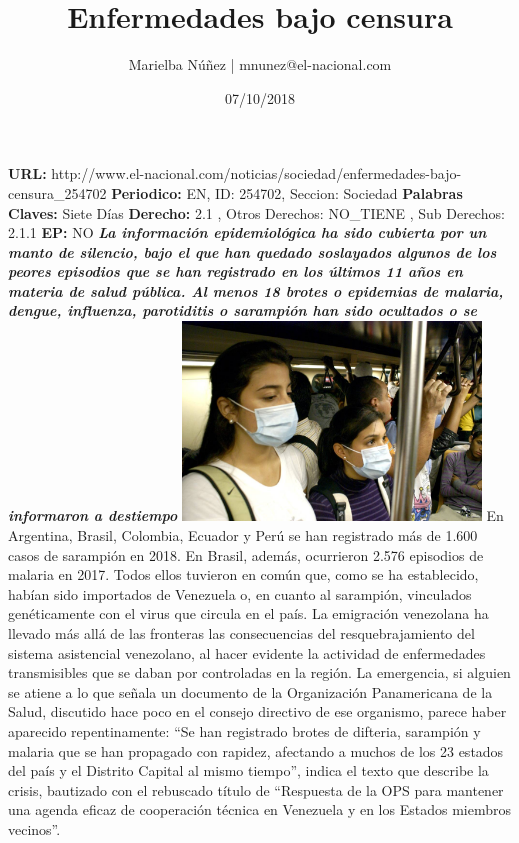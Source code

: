 \documentclass{article}%
\title{\textbf{Enfermedades bajo censura}}%
\author{Marielba Núñez | mnunez@el{-}nacional.com}%
\date{07/10/2018}%
\begin{document}
%
\normalsize%
\maketitle%
\textbf{URL: }%
http://www.el{-}nacional.com/noticias/sociedad/enfermedades{-}bajo{-}censura\_254702\newline%
%
\textbf{Periodico: }%
EN, %
ID: %
254702, %
Seccion: %
Sociedad\newline%
%
\textbf{Palabras Claves: }%
Siete Días\newline%
%
\textbf{Derecho: }%
2.1%
, Otros Derechos: %
NO\_TIENE%
, Sub Derechos: %
2.1.1%
\newline%
%
\textbf{EP: }%
NO\newline%
\newline%
%
\textbf{\textit{La información epidemiológica ha sido cubierta por un manto de silencio, bajo el que han quedado soslayados algunos de los peores episodios que se han registrado en los últimos 11 años en materia de salud pública. Al menos 18 brotes o epidemias de malaria, dengue, influenza, parotiditis o sarampión han sido ocultados o se informaron a destiempo}}%
\newline%
\newline%
%
\includegraphics[width=300px]{159.jpg}%
\newline%
%
En Argentina, Brasil, Colombia, Ecuador y Perú se han registrado más de 1.600 casos de sarampión en 2018. En Brasil, además, ocurrieron 2.576 episodios de malaria en 2017. Todos ellos tuvieron en común que, como se ha establecido, habían sido importados de Venezuela o, en cuanto al sarampión, vinculados genéticamente con el virus que circula en el país.%
\newline%
%
La emigración venezolana ha llevado más allá de las fronteras las consecuencias del resquebrajamiento del sistema asistencial venezolano, al hacer evidente la actividad de enfermedades transmisibles que se daban por controladas en la región. La emergencia, si alguien se atiene a lo que señala un documento de la Organización Panamericana de la Salud, discutido hace poco en el consejo directivo de ese organismo, parece haber aparecido repentinamente: “Se han registrado brotes de difteria, sarampión y malaria que se han propagado con rapidez, afectando a muchos de los 23 estados del país y el Distrito Capital al mismo tiempo”, indica el texto que describe la crisis, bautizado con el rebuscado título de “Respuesta de la OPS para mantener una agenda eficaz de cooperación técnica en Venezuela y en los Estados miembros vecinos”.%
\end{document}
